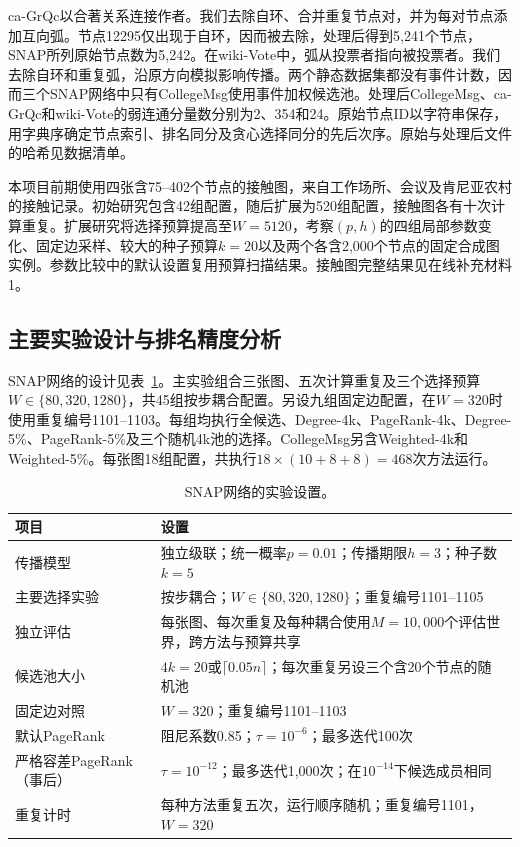 \documentclass[smallextended]{svjour3}
\begin{document}
ca-GrQc以合著关系连接作者\cite{grqc}。我们去除自环、合并重复节点对，并为每对节点添加互向弧。节点12295仅出现于自环，因而被去除，处理后得到5,241个节点，SNAP所列原始节点数为5,242。在wiki-Vote中，弧从投票者指向被投票者\cite{signed,links}。我们去除自环和重复弧，沿原方向模拟影响传播。两个静态数据集都没有事件计数，因而三个SNAP网络中只有CollegeMsg使用事件加权候选池。处理后CollegeMsg、ca-GrQc和wiki-Vote的弱连通分量数分别为2、354和24。原始节点ID以字符串保存，用字典序确定节点索引、排名同分及贪心选择同分的先后次序。原始与处理后文件的哈希见数据清单。

本项目前期使用四张含75--402个节点的接触图，来自工作场所、会议及肯尼亚农村的接触记录\cite{ref3,ref4,ref5,ref6}。初始研究包含42组配置，随后扩展为520组配置，接触图各有十次计算重复。扩展研究将选择预算提高至$W=5120$，考察$(p,h)$的四组局部参数变化、固定边采样、较大的种子预算$k=20$以及两个各含2,000个节点的固定合成图实例\cite{ref17,ref18}。参数比较中的默认设置复用预算扫描结果。接触图完整结果见在线补充材料1。

\subsection{主要实验设计与排名精度分析}
SNAP网络的设计见表~\ref{tab:settings}。主实验组合三张图、五次计算重复及三个选择预算$W\in\{80,320,1280\}$，共45组按步耦合配置。另设九组固定边配置，在$W=320$时使用重复编号1101--1103。每组均执行全候选、Degree-4k、PageRank-4k、Degree-5\%、PageRank-5\%及三个随机4k池的选择。CollegeMsg另含Weighted-4k和Weighted-5\%。每张图18组配置，共执行$18\times(10+8+8)=468$次方法运行。

\begin{table}[htbp]
\caption{SNAP网络的实验设置。}\label{tab:settings}
\begin{tabularx}{\linewidth}{lX}
\toprule
项目 & 设置 \\
\midrule
传播模型 & 独立级联；统一概率$p=0.01$；传播期限$h=3$；种子数$k=5$ \\
主要选择实验 & 按步耦合；$W\in\{80,320,1280\}$；重复编号1101--1105 \\
独立评估 & 每张图、每次重复及每种耦合使用$M=10{,}000$个评估世界，跨方法与预算共享 \\
候选池大小 & $4k=20$或$\lceil0.05n\rceil$；每次重复另设三个含20个节点的随机池 \\
固定边对照 & $W=320$；重复编号1101--1103 \\
默认PageRank & 阻尼系数0.85；$\tau=10^{-6}$；最多迭代100次 \\
严格容差PageRank（事后） & $\tau=10^{-12}$；最多迭代1,000次；在$10^{-14}$下候选成员相同 \\
重复计时 & 每种方法重复五次，运行顺序随机；重复编号1101，$W=320$ \\
\bottomrule
\end{tabularx}
\end{table}
\end{document}
